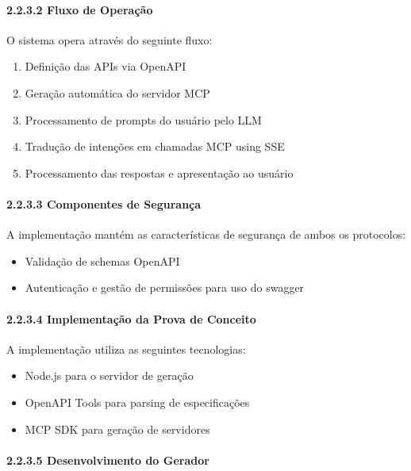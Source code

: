 \documentclass[
]{article}
\providecommand{\tightlist}{%
  \setlength{\itemsep}{0pt}\setlength{\parskip}{0pt}}
\begin{document}
\paragraph{2.2.3.2 Fluxo de Operação}\label{fluxo-de-operauxe7uxe3o}

O sistema opera através do seguinte fluxo:

\begin{enumerate}
\def\labelenumi{\arabic{enumi}.}
\tightlist
\item
  Definição das APIs via OpenAPI
\item
  Geração automática do servidor MCP
\item
  Processamento de prompts do usuário pelo LLM
\item
  Tradução de intenções em chamadas MCP using SSE
\item
  Processamento das respostas e apresentação ao usuário
\end{enumerate}

\paragraph{2.2.3.3 Componentes de
Segurança}\label{componentes-de-seguranuxe7a-1}

A implementação mantém as características de segurança de ambos os
protocolos:

\begin{itemize}
\tightlist
\item
  Validação de schemas OpenAPI
\item
  Autenticação e gestão de permissões para uso do swagger
\end{itemize}

\paragraph{2.2.3.4 Implementação da Prova de
Conceito}\label{implementauxe7uxe3o-da-prova-de-conceito-1}

A implementação utiliza as seguintes tecnologias:

\begin{itemize}
\tightlist
\item
  Node.js para o servidor de geração
\item
  OpenAPI Tools para parsing de especificações
\item
  MCP SDK para geração de servidores
\end{itemize}

\paragraph{2.2.3.5 Desenvolvimento do
Gerador}\label{desenvolvimento-do-gerador}
\end{document}
